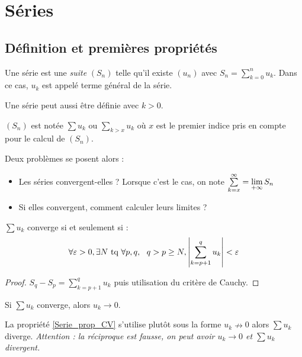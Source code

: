\chapter{Séries}
\section{Définition et premières propriétés}

\begin{defi}
Une série est une \emph{suite} $(S_n)$ telle qu'il existe $(u_n)$ avec $S_n = \sum\limits_{k=0}^{n}u_k$. Dans ce cas, $u_k$ est appelé terme général de la série.
\end{defi}
\begin{rem}
	Une série peut aussi être définie avec $k>0$.
\end{rem}
\begin{nota}
	$(S_n)$ est notée $\sum u_k$ ou $\sum\limits_{k>x} u_k$ où $x$ est le premier indice pris en compte pour le calcul de $(S_n)$.
\end{nota}

Deux problèmes se posent alors :
\begin{itemize}
	\item Les séries convergent-elles ? Lorsque c'est le cas, on note $\sum\limits_{k=x}^{\infty} = \lim\limits_{+\infty}S_n$
	\item Si elles convergent, comment calculer leurs limites ?
\end{itemize}

\begin{prop}
$\sum u_k$ converge si et seulement si :
$$\forall\varepsilon>0,\exists N\text{~tq~}\forall p,q,~~q>p\geq N, \left|\sum\limits_{k=p+1}^q u_k\right| <\varepsilon$$
\end{prop}

\begin{proof}
$S_q-S_p = \sum\limits_{k=p+1}^q u_k$ puis utilisation du critère de Cauchy.
\end{proof}

\begin{prop} \label{Serie_prop_CV}
Si $\sum u_k$ converge, alors $u_k\to0$.
\end{prop}

\begin{rem}
La propriété \ref{Serie_prop_CV} s'utilise plutôt sous la forme $u_k\nrightarrow0$ alors $\sum u_k$ diverge. \emph{Attention : la réciproque est fausse, on peut avoir $u_k\to0$ et $\sum u_k$ divergent.}
\end{rem}

